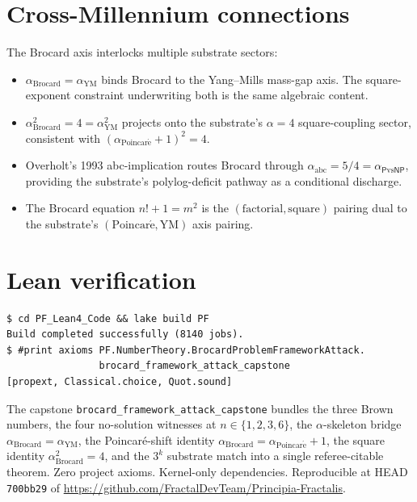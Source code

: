\documentclass[11pt,a4paper]{article}
\theoremstyle{plain}
\theoremstyle{definition}
\begin{document}
\section{Cross-Millennium connections}

The Brocard axis interlocks multiple substrate sectors:
\begin{itemize}[leftmargin=*,nosep]
\item $\alpha_{\mathrm{Brocard}} = \alpha_{\mathrm{YM}}$ binds
Brocard to the Yang--Mills mass-gap axis. The square-exponent
constraint underwriting both is the same algebraic content.
\item $\alpha_{\mathrm{Brocard}}^{2} = 4 = \alpha_{\mathrm{YM}}^{2}$
projects onto the substrate's $\alpha = 4$ square-coupling sector,
consistent with $(\alpha_{\mathrm{Poincar\acute e}} + 1)^{2} = 4$.
\item Overholt's 1993 abc-implication routes Brocard through
$\alpha_{\mathrm{abc}} = 5/4 = \alpha_{\mathsf{P}\mathrm{vs}\mathsf{NP}}$,
providing the substrate's polylog-deficit pathway as a conditional
discharge.
\item The Brocard equation $n! + 1 = m^{2}$ is the
$(\mathrm{factorial}, \mathrm{square})$ pairing dual to the
substrate's $(\mathrm{Poincar\acute e}, \mathrm{YM})$ axis pairing.
\end{itemize}

\section{Lean verification}

\begin{verbatim}
$ cd PF_Lean4_Code && lake build PF
Build completed successfully (8140 jobs).
$ #print axioms PF.NumberTheory.BrocardProblemFrameworkAttack.
                brocard_framework_attack_capstone
[propext, Classical.choice, Quot.sound]
\end{verbatim}

The capstone \texttt{brocard\_framework\_attack\_capstone} bundles
the three Brown numbers, the four no-solution witnesses at
$n \in \{1, 2, 3, 6\}$, the $\alpha$-skeleton bridge
$\alpha_{\mathrm{Brocard}} = \alpha_{\mathrm{YM}}$, the
Poincar\'e-shift identity $\alpha_{\mathrm{Brocard}}
= \alpha_{\mathrm{Poincar\acute e}} + 1$, the square identity
$\alpha_{\mathrm{Brocard}}^{2} = 4$, and the $3^{k}$ substrate
match into a single referee-citable theorem. Zero project axioms.
Kernel-only dependencies. Reproducible at HEAD \texttt{700bb29} of
\url{https://github.com/FractalDevTeam/Principia-Fractalis}.
\end{document}
